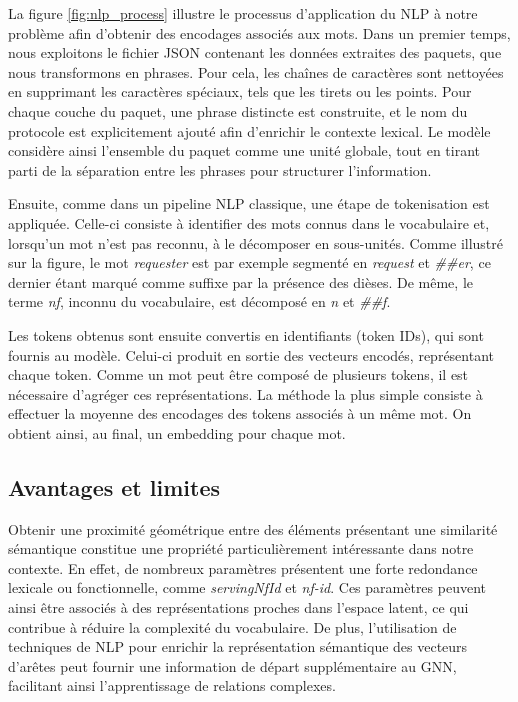 \documentclass[a4paper,11pt,twoside]{StyleThese}
\begin{document}
La figure \ref{fig:nlp_process} illustre le processus d’application du NLP à notre problème afin d’obtenir des encodages associés aux mots. Dans un premier temps, nous exploitons le fichier JSON contenant les données extraites des paquets, que nous transformons en phrases. Pour cela, les chaînes de caractères sont nettoyées en supprimant les caractères spéciaux, tels que les tirets ou les points. Pour chaque couche du paquet, une phrase distincte est construite, et le nom du protocole est explicitement ajouté afin d’enrichir le contexte lexical. Le modèle considère ainsi l’ensemble du paquet comme une unité globale, tout en tirant parti de la séparation entre les phrases pour structurer l’information.

Ensuite, comme dans un pipeline NLP classique, une étape de tokenisation est appliquée. Celle-ci consiste à identifier des mots connus dans le vocabulaire et, lorsqu’un mot n’est pas reconnu, à le décomposer en sous-unités. Comme illustré sur la figure, le mot \textit{requester} est par exemple segmenté en \textit{request} et \textit{\#\#er}, ce dernier étant marqué comme suffixe par la présence des dièses. De même, le terme \textit{nf}, inconnu du vocabulaire, est décomposé en \textit{n} et \textit{\#\#f}.

Les tokens obtenus sont ensuite convertis en identifiants (token IDs), qui sont fournis au modèle. Celui-ci produit en sortie des vecteurs encodés, représentant chaque token. Comme un mot peut être composé de plusieurs tokens, il est nécessaire d’agréger ces représentations. La méthode la plus simple consiste à effectuer la moyenne des encodages des tokens associés à un même mot. On obtient ainsi, au final, un embedding pour chaque mot.

\subsection{Avantages et limites}
Obtenir une proximité géométrique entre des éléments présentant une similarité sémantique constitue une propriété particulièrement intéressante dans notre contexte. En effet, de nombreux paramètres présentent une forte redondance lexicale ou fonctionnelle, comme \textit{servingNfId} et \textit{nf-id}. Ces paramètres peuvent ainsi être associés à des représentations proches dans l’espace latent, ce qui contribue à réduire la complexité du vocabulaire. De plus, l’utilisation de techniques de NLP pour enrichir la représentation sémantique des vecteurs d’arêtes peut fournir une information de départ supplémentaire au GNN, facilitant ainsi l’apprentissage de relations complexes.
\end{document}

